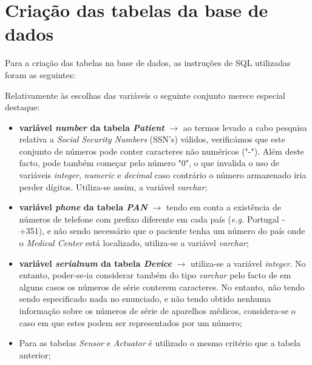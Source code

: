 \documentclass[a4paper]{article}
\begin{document}
\lstset{language=Pascal}


\tableofcontents
{}
\pagebreak

\section{Criação das tabelas da base de dados}
Para a criação das tabelas na base de dados, as instruções de SQL utilizadas foram as seguintes:



Relativamente às escolhas das variáveis o seguinte conjunto merece especial destaque:
\begin{itemize}

  \item \textbf{variável \textit{number} da tabela \textit{Patient}} $\rightarrow$ ao termos levado a cabo pesquisa relativa a \textit{Social Security Numbers} (SSN's) válidos, verificámos que este conjunto de números pode conter caracteres não numéricos ("-"). Além deste facto, pode também começar pelo número "0", o que invalida o uso de variáveis \textit{integer}, \textit{numeric} e \textit{decimal} caso contrário o número armazenado iria perder dígitos. Utiliza-se assim, a variável \textit{varchar};
  
  \item \textbf{variável \textit{phone} da tabela \textit{PAN}} $\rightarrow$ tendo em conta a existência de números de telefone com prefixo diferente em cada país (\textit{e.g.} Portugal - +351), e não sendo necessário que o paciente tenha um número do país onde o \textit{Medical Center} está localizado, utiliza-se a variável \textit{varchar};
  
  \item \textbf{variável \textit{serialnum} da tabela \textit{Device}} $\rightarrow$ utiliza-se a variável \textit{integer}. No entanto, poder-se-ia considerar também do tipo \textit{varchar} pelo facto de em alguns casos os números de série conterem caracteres. No entanto, não tendo sendo especificado nada no enunciado, e não tendo obtido nenhuma informação sobre os números de série de aparelhos médicos, considera-se o caso em que estes podem ser representados por um número;
  
  \item Para as tabelas \textit{Sensor} e \textit{Actuator} é utilizado o mesmo critério que a tabela anterior;
  

\end{itemize}
\end{document}
